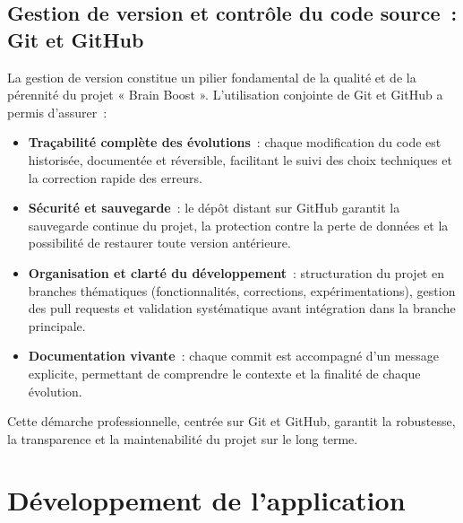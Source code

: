 \documentclass[a4paper,11pt]{report}
\begin{document}
\subsection{Gestion de version et contrôle du code source : Git et GitHub}
La gestion de version constitue un pilier fondamental de la qualité et de la pérennité du projet « Brain Boost ». L'utilisation conjointe de Git et GitHub a permis d'assurer :
\begin{itemize}
    \item \textbf{Traçabilité complète des évolutions} : chaque modification du code est historisée, documentée et réversible, facilitant le suivi des choix techniques et la correction rapide des erreurs.
    \item \textbf{Sécurité et sauvegarde} : le dépôt distant sur GitHub garantit la sauvegarde continue du projet, la protection contre la perte de données et la possibilité de restaurer toute version antérieure.
    \item \textbf{Organisation et clarté du développement} : structuration du projet en branches thématiques (fonctionnalités, corrections, expérimentations), gestion des pull requests et validation systématique avant intégration dans la branche principale.
    \item \textbf{Documentation vivante} : chaque commit est accompagné d'un message explicite, permettant de comprendre le contexte et la finalité de chaque évolution.
\end{itemize}
Cette démarche professionnelle, centrée sur Git et GitHub, garantit la robustesse, la transparence et la maintenabilité du projet sur le long terme.

\section{Développement de l'application}
\end{document}
